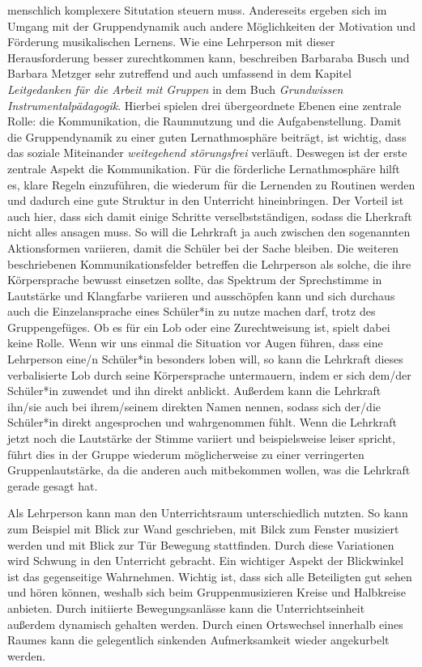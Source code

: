 menschlich komplexere Situtation steuern muss. Andereseits ergeben sich im
Umgang mit der Gruppendynamik auch andere Möglichkeiten der Motivation und
Förderung musikalischen Lernens.
Wie eine Lehrperson mit dieser Herausforderung besser zurechtkommen kann,
beschreiben Barbaraba Busch und Barbara Metzger sehr zutreffend und auch
umfassend in dem Kapitel \emph{Leitgedanken für die Arbeit mit Gruppen} in dem Buch
\emph{Grundwissen Instrumentalpädagogik}. Hierbei spielen drei übergeordnete Ebenen
eine zentrale Rolle: die Kommunikation, die Raumnutzung und die
Aufgabenstellung. Damit die Gruppendynamik zu einer guten
Lernathmosphäre beiträgt, ist wichtig, dass das soziale Miteinander \emph{weitegehend
störungsfrei} verläuft. Deswegen ist der erste zentrale Aspekt die
Kommunikation. Für die förderliche Lernathmosphäre hilft es, klare Regeln
einzuführen, die wiederum für die Lernenden zu Routinen werden und dadurch eine
gute Struktur in den Unterricht hineinbringen. Der Vorteil ist auch hier, dass
sich damit einige Schritte verselbstständigen, sodass die Lherkraft nicht alles
ansagen muss. So will die Lehrkraft ja auch zwischen den sogenannten
Aktionsformen variieren, damit die Schüler bei der Sache bleiben. Die weiteren
beschriebenen Kommunikationsfelder betreffen die Lehrperson als solche, die ihre
Körpersprache bewusst einsetzen sollte, das Spektrum der Sprechstimme in
Lautstärke und Klangfarbe variieren und ausschöpfen kann und sich durchaus auch
die Einzelansprache eines Schüler*in zu nutze machen darf, trotz des
Gruppengefüges. Ob es für ein Lob oder eine Zurechtweisung ist, spielt dabei
keine Rolle. Wenn wir uns einmal die Situation vor Augen führen, dass eine
Lehrperson eine/n Schüler*in besonders loben will, so kann die Lehrkraft dieses
verbalisierte Lob durch seine Körpersprache untermauern, indem er sich dem/der
Schüler*in zuwendet und ihn direkt anblickt. Außerdem kann die Lehrkraft ihn/sie auch bei ihrem/seinem
direkten Namen nennen, sodass sich der/die Schüler*in direkt angesprochen und
wahrgenommen fühlt. Wenn die Lehrkraft jetzt noch die Lautstärke der Stimme
variiert und beispielsweise leiser spricht, führt dies in der Gruppe wiederum
möglicherweise zu einer verringerten Gruppenlautstärke, da die anderen auch
mitbekommen wollen, was die Lehrkraft gerade gesagt hat. 

Als Lehrperson kann man
den Unterrichtsraum unterschiedlich nutzten. So kann zum Beispiel mit Blick zur
Wand geschrieben, mit Bilck zum Fenster musiziert werden und mit Blick zur Tür
Bewegung stattfinden. Durch diese Variationen wird Schwung in den Unterricht
gebracht. Ein wichtiger Aspekt der Blickwinkel ist das gegenseitige Wahrnehmen.
Wichtig ist, dass sich alle Beteiligten gut sehen und hören können, weshalb sich
beim Gruppenmusizieren Kreise und Halbkreise anbieten. Durch initiierte
Bewegungsanlässe kann die Unterrichtseinheit außerdem dynamisch gehalten werden.
Durch einen Ortswechsel innerhalb eines Raumes kann die gelegentlich sinkenden
Aufmerksamkeit wieder angekurbelt werden. 

